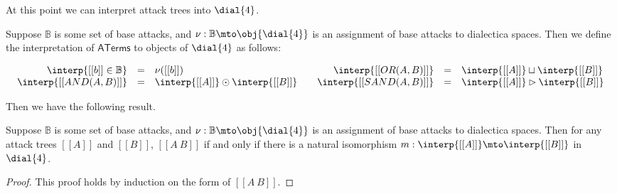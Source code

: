 At this point we can interpret attack trees into $\dial{4}$.
\begin{definition}
  \label{def:interp-aterms-ternary}
  Suppose $\mathbb{B}$ is some set of base attacks, and $\nu :
  \mathbb{B} \mto \obj{\dial{4}}$ is an assignment of base attacks to
  dialectica spaces.  Then we define the interpretation of
  $\mathsf{ATerms}$ to objects of $\dial{4}$ as follows:
  \begin{center}
    \begin{math}
      \setlength{\arraycolsep}{5px}
      \begin{array}{lll}
        \begin{array}{rll}
          \interp{[[b]] \in \mathbb{B}} & = & \nu([[b]])\\
        \interp{[[AND(A,B)]]} & = & \interp{[[A]]} \odot \interp{[[B]]}\\
        \end{array}
        &
        \begin{array}{rll}
          \interp{[[OR(A,B)]]} & = & \interp{[[A]]} \sqcup \interp{[[B]]}\\
          \interp{[[SAND(A,B)]]} & = & \interp{[[A]]} \rhd \interp{[[B]]}\\          
        \end{array}
      \end{array}
    \end{math}
  \end{center}
\end{definition}
Then we have the following result.
\begin{lemma}
  \label{lemma:equivalence_of_attack_trees_lineale}
  Suppose $\mathbb{B}$ is some set of base attacks, and $\nu :
  \mathbb{B} \mto \obj{\dial{4}}$ is an assignment of base attacks to
  dialectica spaces.  Then for any attack trees $[[A]]$ and $[[B]]$,
  $[[A ~ B]]$ if and only if there is a natural isomorphism $m :
  \interp{[[A]]} \mto \interp{[[B]]}$ in $\dial{4}$.
\end{lemma}
\begin{proof}
  This proof holds by induction on the form of $[[A ~ B]]$.
\end{proof}

